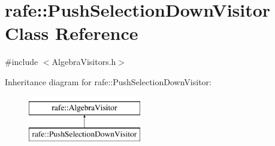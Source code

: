 \hypertarget{classrafe_1_1_push_selection_down_visitor}{\section{rafe\+:\+:Push\+Selection\+Down\+Visitor Class Reference}
\label{classrafe_1_1_push_selection_down_visitor}
}


{\ttfamily \#include $<$Algebra\+Visitors.\+h$>$}

Inheritance diagram for rafe\+:\+:Push\+Selection\+Down\+Visitor\+:\begin{figure}[H]
\begin{center}
\leavevmode
\includegraphics[height=2.000000cm]{classrafe_1_1_push_selection_down_visitor}
\end{center}
\end{figure}
